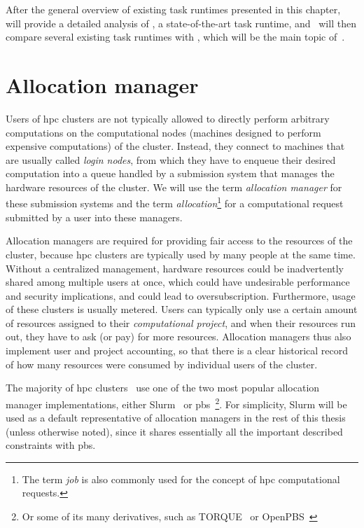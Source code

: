 After the general overview of existing task runtimes presented in this
chapter,~ will provide a detailed analysis of \dask{}, a
state-of-the-art task runtime, and~ will then compare several existing task
runtimes with \hyperqueue{}, which will be the main topic of~.

\section{Allocation manager}
\label{challenge:allocation-manager}
Users of \gls{hpc} clusters are not typically allowed to directly perform arbitrary
computations on the computational nodes (machines designed to perform expensive computations) of
the cluster. Instead, they connect to machines that are usually called \emph{login nodes}, from
which they have to enqueue their desired computation into a queue handled by a submission system
that manages the hardware resources of the cluster. We will use the term \emph{allocation manager} for
these submission systems and the term \emph{allocation}\footnote{The term \emph{job} is also commonly used for the concept of \gls{hpc}
computational requests.} for a
computational request submitted by a user into these managers.

Allocation managers are required for providing fair access to the resources of the cluster, because
\gls{hpc} clusters are typically used by many people at the same time. Without a
centralized management, hardware resources could be inadvertently shared among multiple users at
once, which could have undesirable performance and security implications, and could lead to
oversubscription. Furthermore, usage of these clusters is usually metered. Users can typically only
use a certain amount of resources assigned to their \emph{computational project}, and when their
resources run out, they have to ask (or pay) for more resources. Allocation managers thus also
implement user and project accounting, so that there is a clear historical record of how many
resources were consumed by individual users of the cluster.

The majority of \gls{hpc} clusters~\cite{slurm-schedmd} use one of the two most
popular allocation manager implementations, either Slurm~\cite{slurm} or
\gls{pbs}~\cite{pbs}\footnote{Or some of its many derivatives,
such as TORQUE~\cite{torque} or OpenPBS~\cite{openpbs}}. For simplicity, Slurm will be
used as a default representative of allocation managers in the rest of this thesis (unless
otherwise noted), since it shares essentially all the important described constraints with
\gls{pbs}.

